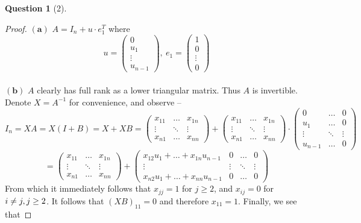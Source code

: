 \documentclass[11pt]{article}
\theoremstyle{quest}
\newtheorem*{question}{Question}
\begin{document}
\begin{question}[2]
\end{question}
\begin{proof}
$\mathbf{(a)}$ $A = I_n + u \cdot e_1^T$ where
$$u = \begin{pmatrix}
0 \\
u_1 \\
\vdots \\
u_{n-1}
\end{pmatrix},\ e_1 = \begin{pmatrix}
1 \\
0 \\
\vdots \\
0
\end{pmatrix}$$
\\$\mathbf{(b)}$ $A$ clearly has full rank as a lower triangular matrix. Thus $A$ is invertible. Denote $X = A^{-1}$ for convenience, and observe --
$$I_n = XA = X(I + B) = X + XB = \begin{pmatrix}
x_{11} & \ldots & x_{1n} \\
\vdots & \ddots & \vdots \\
x_{n1} & \ldots & x_{nn}
\end{pmatrix} + \begin{pmatrix}
x_{11} & \ldots & x_{1n} \\
\vdots & \ddots & \vdots \\
x_{n1} & \ldots & x_{nn}
\end{pmatrix} \cdot \begin{pmatrix}
0 & \ldots & 0 \\
u_1 & \ldots & 0 \\
\vdots & \ddots & \vdots \\
u_{n-1} & \ldots & 0
\end{pmatrix}$$
$$= \begin{pmatrix}
x_{11} & \ldots & x_{1n} \\
\vdots & \ddots & \vdots \\
x_{n1} & \ldots & x_{nn}
\end{pmatrix} + \begin{pmatrix}
x_{12} u_1 + \ldots + x_{1n} u_{n-1} & 0 & \ldots & 0 \\
\vdots & \vdots & \ddots & \vdots \\
x_{n2} u_1 + \ldots + x_{nn} u_{n-1} & 0 & \ldots & 0
\end{pmatrix}$$
From which it immediately follows that $x_{jj} = 1$ for $j \ge 2$, and $x_{ij} = 0$ for $i \ne j,\\ j \ge 2$. It follows that $(XB)_{11} = 0$ and therefore $x_{11} = 1$. Finally, we see that

\end{proof}
\end{document}
